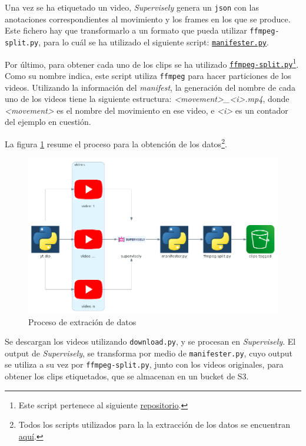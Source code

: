 Una vez se ha etiquetado un video, \textit{Supervisely} genera un \texttt{json} con las anotaciones correspondientes al movimiento y los frames en los que se produce. Este fichero hay que transformarlo a un formato que pueda utilizar \texttt{ffmpeg-split.py}, para lo cuál se ha utilizado el siguiente script: \href{https://github.com/plaguss/tfm-misc/blob/main/scripts/manifester.py}{\texttt{manifester.py}}.

Por último, para obtener cada uno de los clips se ha utilizado \href{https://github.com/plaguss/tfm-misc/blob/main/scripts/ffmpeg-split.py}{\texttt{ffmpeg-split.py}}\footnote{Este script pertenece al siguiente \href{https://github.com/c0decracker/video-splitter}{repositorio}.}. Como su nombre indica, este script utiliza \texttt{ffmpeg} para hacer particiones de los videos. Utilizando la información del \textit{manifest}, la generación del nombre de cada uno de los videos tiene la siguiente estructura: \textit{<movement>\_<i>.mp4}, donde \textit{<movement>} es el nombre del movimiento en ese video, e \textit{<i>} es un contador del ejemplo en cuestión.

La figura \ref{data_extraction_process} resume el proceso para la obtención de los datos\footnote{Todos los scripts utilizados para la la extracción de los datos se encuentran \href{https://github.com/plaguss/tfm-misc/tree/main/scripts}{aquí}.}.

\begin{figure}[H]
    \centering
		\includegraphics[width=\textwidth]{figs/data_extraction_process_.png}
\caption{Proceso de extración de datos}\label{data_extraction_process}
\end{figure}

Se descargan los videos utilizando \texttt{download.py}, y se procesan en \textit{Supervisely}. El output de \textit{Supervisely}, se transforma por medio de \texttt{manifester.py}, cuyo output se utiliza a su vez por \texttt{ffmpeg-split.py}, junto con los videos originales, para obtener los clips etiquetados, que se almacenan en un bucket de S3.


